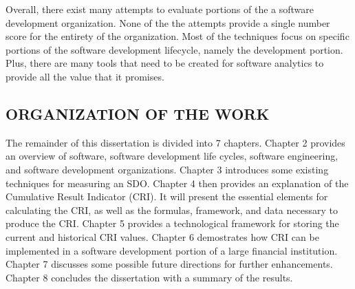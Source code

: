 \documentclass[SDSUThesis.tex]{subfiles}
\begin{document}
    Overall, there exist many attempts to 
    evaluate portions of the a software development 
    organization.  None of the the attempts provide
    a single number score for the entirety of the 
    organization.  Most of the techniques focus on
    specific portions of the software development 
    lifecycle, namely the development portion. Plus,
    there are many tools that need to be created for
    software analytics to provide all the value
    that it promises.

\subsection{ORGANIZATION OF THE WORK}

    The remainder of this dissertation is divided into 7 chapters.  Chapter 2 provides
    an overview of software, software development life cycles, software engineering, and software
    development organizations.  Chapter 3 introduces some existing techniques for measuring
    an SDO. Chapter 4 then provides an explanation of the Cumulative
    Result Indicator (CRI).  It will present the essential elements for calculating the CRI, as well
    as the formulas, framework, and data necessary to produce the CRI. Chapter 5 provides
    a technological framework for storing the current and historical CRI values.
    Chapter 6 demostrates how CRI can be implemented in a software development portion of 
    a large financial institution. Chapter 7 discusses some possible future directions 
    for further enhancements. Chapter 8 concludes the dissertation with a summary
    of the results. 
\end{document}
